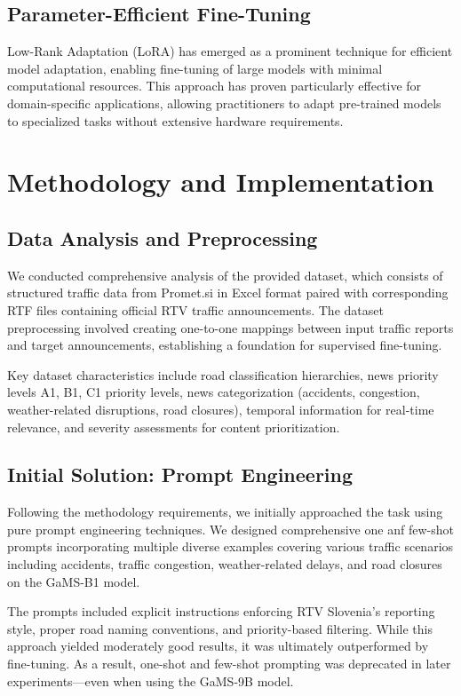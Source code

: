\documentclass[fleqn,moreauthors,10pt]{ds_report}
\begin{document}
\subsection*{Parameter-Efficient Fine-Tuning}
Low-Rank Adaptation (LoRA) has emerged as a prominent technique for efficient model adaptation, enabling fine-tuning of large models with minimal computational resources. This approach has proven particularly effective for domain-specific applications, allowing practitioners to adapt pre-trained models to specialized tasks without extensive hardware requirements.

\section*{Methodology and Implementation}

\subsection*{Data Analysis and Preprocessing}
We conducted comprehensive analysis of the provided dataset, which consists of structured traffic data from Promet.si in Excel format paired with corresponding RTF files containing official RTV traffic announcements. The dataset preprocessing involved creating one-to-one mappings between input traffic reports and target announcements, establishing a foundation for supervised fine-tuning.

Key dataset characteristics include road classification hierarchies, news priority levels A1, B1, C1 priority levels, news categorization (accidents, congestion, weather-related disruptions, road closures), temporal information for real-time relevance, and severity assessments for content prioritization.

\subsection*{Initial Solution: Prompt Engineering}
Following the methodology requirements, we initially approached the task using pure prompt engineering techniques. We designed comprehensive one anf few-shot prompts incorporating multiple diverse examples covering various traffic scenarios including accidents, traffic congestion, weather-related delays, and road closures on the GaMS-B1 model.

The prompts included explicit instructions enforcing RTV Slovenia's reporting style, proper road naming conventions, and priority-based filtering. While this approach yielded moderately good results, it was ultimately outperformed by fine-tuning. As a result, one-shot and few-shot prompting was deprecated in later experiments—even when using the GaMS-9B model.
\end{document}
